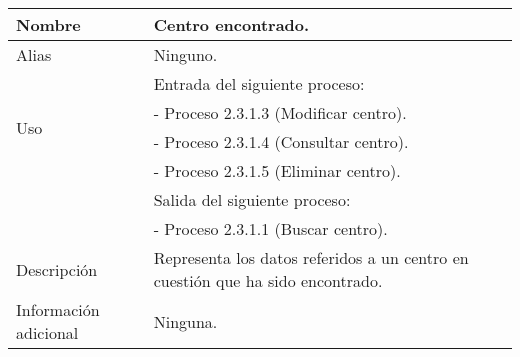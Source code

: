 \begin{center}
  \begin{tabular}{| l | p{9cm} |}
    \hline
    Nombre & \textbf{Centro encontrado}.\\
    \hline
    Alias & Ninguno.\\
    \hline
    \multirow{4}{*}{Uso} & Entrada del siguiente proceso:\\
                         & - Proceso 2.3.1.3 (Modificar centro).\\
                         & - Proceso 2.3.1.4 (Consultar centro).\\
                         & - Proceso 2.3.1.5 (Eliminar centro).\\
                         & Salida del siguiente proceso:\\
                         & - Proceso 2.3.1.1 (Buscar centro).\\
    \hline
    Descripción & Representa los datos referidos a un centro en cuestión que ha
                  sido encontrado.\\
    \hline
    Información adicional & Ninguna.\\
    \hline
  \end{tabular}
\end{center}
